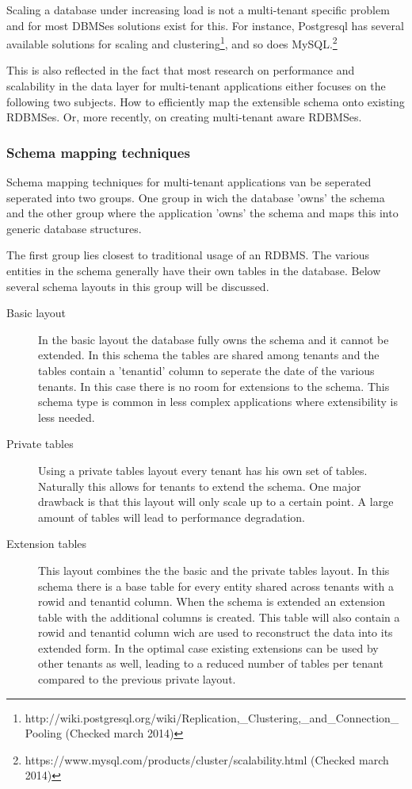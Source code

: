 Scaling a database under increasing load is not a multi-tenant specific problem and for most DBMSes solutions exist for this. 
For instance, Postgresql has several available solutions for scaling and clustering\footnote{http://wiki.postgresql.org/wiki/Replication,\_Clustering,\_and\_Connection\_Pooling (Checked march 2014)}, and so does MySQL.\footnote{https://www.mysql.com/products/cluster/scalability.html (Checked march 2014)}

This is also reflected in the fact that most research on performance and scalability in the data layer for multi-tenant applications either focuses on the following two subjects.
How to efficiently map the extensible schema onto existing RDBMSes.\cite{aulbach2008multi, aulbach2009comparison} 
Or, more recently, on creating multi-tenant aware RDBMSes.\cite{schiller2011native, aulbach2011extensibility} 

\subsubsection{Schema mapping techniques}
Schema mapping techniques for multi-tenant applications van be seperated seperated into two groups. 
One group in wich the database 'owns' the schema  and the other group where the application 'owns' the schema and maps this into generic database structures.\cite{aulbach2009comparison}

The first group lies closest to traditional usage of an RDBMS. 
The various entities in the schema generally have their own tables in the database.
Below several schema layouts in this group will be discussed.
\begin{description}
	\item[Basic layout] In the basic layout the database fully owns the schema and it cannot be extended. 
		In this schema the tables are shared among tenants and the tables contain a 'tenantid' column to seperate the date of the various tenants.
		In this case there is no room for extensions to the schema. 
		This schema type is common in less complex applications where extensibility is less needed. \cite{aulbach2008multi}
	\item[Private tables] Using a private tables layout every tenant has his own set of tables. 
		Naturally this allows for tenants to extend the schema. 
		One major drawback is that this layout will only scale up to a certain point. 
		A large amount of tables will lead to performance degradation.\cite{aulbach2008multi}
	\item[Extension tables]
		This layout combines the the basic and the private tables layout.
		In this schema there is a base table for every entity shared across tenants with a rowid and tenantid column.
		When the schema is extended an extension table with the additional columns is created.
		This table will also contain a rowid and tenantid column wich are used to reconstruct the data into its extended form.
		In the optimal case existing extensions can be used by other tenants as well, leading to a reduced number of tables per tenant compared to the previous private layout.\cite{aulbach2008multi}
\end{description}

